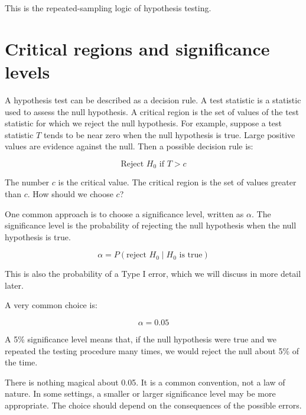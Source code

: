 \documentclass[
  letterpaper,
  DIV=11,
  numbers=noendperiod]{scrreprt}
\begin{document}
This is the repeated-sampling logic of hypothesis testing.

\section{Critical regions and significance
levels}\label{critical-regions-and-significance-levels}

A hypothesis test can be described as a decision rule. A test statistic
is a statistic used to assess the null hypothesis. A critical region is
the set of values of the test statistic for which we reject the null
hypothesis. For example, suppose a test statistic \(T\) tends to be near
zero when the null hypothesis is true. Large positive values are
evidence against the null. Then a possible decision rule is:

\[
\text{Reject } H_0 \text{ if } T > c
\]

The number \(c\) is the critical value. The critical region is the set
of values greater than \(c\). How should we choose \(c\)?

One common approach is to choose a significance level, written as
\(\alpha\). The significance level is the probability of rejecting the
null hypothesis when the null hypothesis is true.

\[
\alpha = P(\text{reject } H_0 \mid H_0 \text{ is true})
\]

This is also the probability of a Type I error, which we will discuss in
more detail later.

A very common choice is:

\[
\alpha = 0.05
\]

A 5\% significance level means that, if the null hypothesis were true
and we repeated the testing procedure many times, we would reject the
null about 5\% of the time.

\begin{tcolorbox}[enhanced jigsaw, arc=.35mm, bottomrule=.15mm, bottomtitle=1mm, breakable, colback=white, colbacktitle=quarto-callout-important-color!10!white, colframe=quarto-callout-important-color-frame, coltitle=black, left=2mm, leftrule=.75mm, opacityback=0, opacitybacktitle=0.6, rightrule=.15mm, title=\textcolor{quarto-callout-important-color}{\faExclamation}\hspace{0.5em}{Warning: The 5\% level is a convention}, titlerule=0mm, toprule=.15mm, toptitle=1mm]

There is nothing magical about 0.05. It is a common convention, not a
law of nature. In some settings, a smaller or larger significance level
may be more appropriate. The choice should depend on the consequences of
the possible errors.

\end{tcolorbox}
\end{document}
